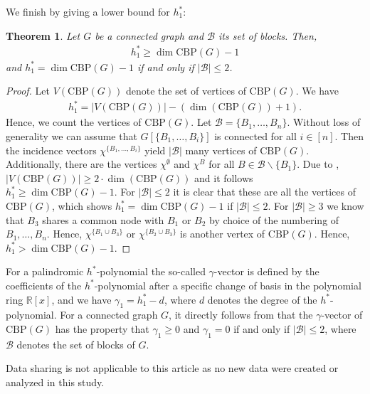 \documentclass[12pt]{amsart}
\newtheorem{theorem}{Theorem}[section]
\newcommand{\R}{\mathbb{R}}
\newcommand{\CBP}{\mathrm{CBP}}
\newcommand{\B}{\mathcal{B}}
\begin{document}
We finish by giving a lower bound for $h_1^\ast$:

\begin{theorem}
    \label{gamma}
    Let $G$ be a connected graph and $\B$ its set of blocks. Then,
    \begin{align*}
        h_1^\ast \ge \dim \CBP(G)-1
    \end{align*}
    and $h^\ast_1=\dim \CBP(G)-1$ if and only if $\vert \B \vert \le 2$.
\end{theorem}

\begin{proof}
    Let $V(\CBP(G))$ denote the set of vertices of $\CBP(G)$. We have
    \begin{align*}
        h^\ast_1=\vert V(\CBP(G)) \vert -(\dim(\CBP(G))+1).
    \end{align*}
    Hence, we count the vertices of $\CBP(G)$. Let $\B=\{B_1,\ldots,B_n\}$. Without loss of generality we can assume that $G[\{B_1,\ldots,B_i\}]$ is connected for all $i \in [n]$. Then the incidence vectors $\chi^{\{B_1, \ldots, B_i\}}$ yield $\vert \B \vert$ many vertices of $\CBP(G)$. Additionally, there are the vertices $\chi^\emptyset$ and $\chi^B$ for all $B \in \B \backslash \{B_1\}$. Due to , $\vert V(\CBP(G))\vert \ge 2 \cdot \dim(\CBP(G))$ and it follows $h_1^\ast \ge \dim \CBP(G)-1$. For $\vert \B \vert \le 2$ it is clear that these are all the vertices of $\CBP(G)$, which shows $h_1^\ast = \dim \CBP(G)-1$ if $\vert \B \vert \le 2$. For $\vert \B \vert \ge 3$ we know that $B_3$ shares a common node with $B_1$ or $B_2$ by choice of the numbering of $B_1,\ldots,B_n$. Hence, $\chi^{\{B_1 \cup B_3\}}$ or $\chi^{\{B_2 \cup B_3\}}$ is another vertex of $\CBP(G)$. Hence, $h_1^\ast > \dim \CBP(G)-1$.
\end{proof}

For a palindromic $h^\ast$-polynomial the so-called $\gamma$-vector is defined by the coefficients of the $h^\ast$-polynomial after a specific change of basis in the polynomial ring $\R[x]$, and we have $\gamma_1=h^\ast_1-d$, where $d$ denotes the degree of the $h^\ast$-polynomial. For a connected graph $G$, it directly follows from  that the $\gamma$-vector of $\CBP(G)$ has the property that $\gamma_1 \ge 0$ and $\gamma_1=0$ if and only if $\vert \B \vert \le 2$, where $\B$ denotes the set of blocks of $G$.





Data sharing is not applicable to this article as no new data were created or analyzed in this study.
\end{document}
